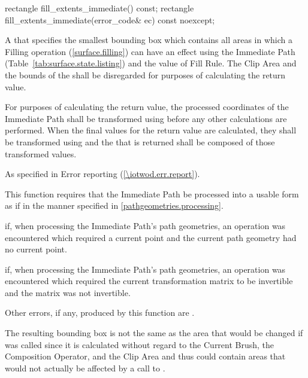 \begin{itemdecl}
rectangle fill_extents_immediate() const;
rectangle fill_extents_immediate(error_code& ec) const noexcept;
\end{itemdecl}
\begin{itemdescr}
\pnum
\returns
A  that specifies the smallest bounding box which contains all areas in which a Filling operation (\ref{surface.filling}) can have an effect using the Immediate Path (Table~\ref{tab:surface.state.listing}) and the value of Fill Rule. The Clip Area and the bounds of the \underlyingsurface shall be disregarded for purposes of calculating the return value.

\pnum
For purposes of calculating the return value, the processed coordinates of the Immediate Path shall be transformed using  before any other calculations are performed. When the final values for the return value are calculated, they shall be transformed using  and the  that is returned shall be composed of those transformed values.

\pnum
\throws
As specified in Error reporting (\ref{\iotwod.err.report}).

\pnum
\remarks
This function requires that the Immediate Path be processed into a usable form as if in the manner specified in \ref{pathgeometries.processing}.

\pnum
\errors
{} if, when processing the Immediate Path's path geometries, an operation was encountered which required a current point and the current path geometry had no current point.

\pnum
{} if, when processing the Immediate Path's path geometries, an operation was encountered which required the current transformation matrix to be invertible and the matrix was not invertible.

\pnum
Other errors, if any, produced by this function are .

\pnum
\realnotes
The resulting bounding box is not the same as the area that would be changed if  was called since it is calculated without regard to the Current Brush, the Composition Operator, and the Clip Area and thus could contain areas that would not actually be affected by a call to .
\end{itemdescr}

